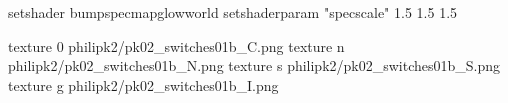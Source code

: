 setshader bumpspecmapglowworld
setshaderparam "specscale" 1.5 1.5 1.5


texture 0 philipk2/pk02_switches01b_C.png
texture n philipk2/pk02_switches01b_N.png
texture s philipk2/pk02_switches01b_S.png
texture g philipk2/pk02_switches01b_I.png

